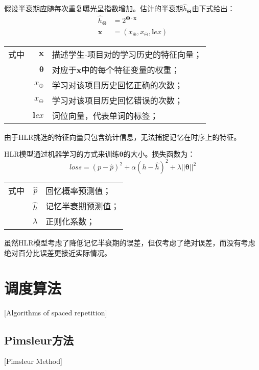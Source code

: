 假设半衰期应随每次重复曝光呈指数增加。估计的半衰期$\hat{h}_{\bm\Theta}$由下式给出：
\begin{equation}
\begin{aligned}
\hat{h}_{\bm\Theta}&=2^{\bm\Theta \cdot \bm x}\\
\bm x &= (x_\mathrm{\oplus},x_\mathrm{\ominus}, \bm lex)
\end{aligned}
\end{equation}
\begin{tabularx}{\textwidth}{@{}l@{\quad}r@{———}X@{}}
    式中& $\bm x$ &描述学生-项目对的学习历史的特征向量；\\
    & $\bm \theta$ &对应于$\bm x$中的每个特征变量的权重；\\
    & $x_\mathrm{\oplus}$ &学习对该项目历史回忆正确的次数；\\
    & $x_\mathrm{\ominus}$ &学习对该项目历史回忆错误的次数；\\
    & $\bm lex$ &词位向量，代表单词的标签；
\end{tabularx}\vspace{3.15bp}

由于HLR挑选的特征向量只包含统计信息，无法捕捉记忆在时序上的特征。

HLR模型通过机器学习的方式来训练$\bm \theta$的大小。损失函数为：
\begin{equation}
\label{eqn:hlr:loss}
loss=(p-\hat p)^2 + \alpha(h-\hat h)^2 + \lambda||\bm\theta||^2
\end{equation}
\begin{tabularx}{\textwidth}{@{}l@{\quad}r@{———}X@{}}
    式中& $\hat p$ &回忆概率预测值；\\
    & $\hat h$ &记忆半衰期预测值；\\
    & $\lambda$ &正则化系数；
\end{tabularx}\vspace{3.15bp}

虽然HLR模型考虑了降低记忆半衰期的误差，但仅考虑了绝对误差，而没有考虑绝对百分比误差更接近实际情况。

\section{调度算法}[Algorithms of spaced repetition]

\subsection{Pimsleur方法}[Pimsleur Method]\label{sec:pimsleur}

